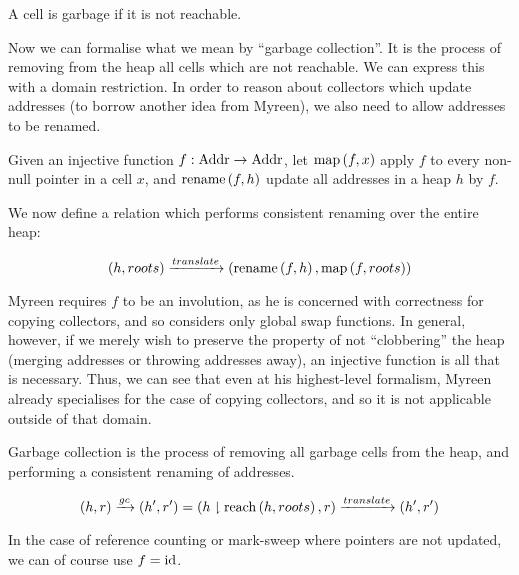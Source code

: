 \begin{definition}[Garbage]
  A cell is garbage if it is not reachable.

  \begin{prooftree}
  \end{prooftree}
\end{definition}

Now we can formalise what we mean by ``\gls{garbage collection}''. It
is the process of removing from the heap all \glspl{cell} which are
not reachable. We can express this with a domain
restriction. In order to reason about \glspl{collector} which update
addresses (to borrow another idea from Myreen), we also need to allow
addresses to be renamed.

\begin{definition}[Translation]
  Given an injective function $f : \addr \to \addr$, let $\map{f}{x}$
  apply $f$ to every non-null pointer in a cell $x$, and
  $\rename{f}{h}$ update all addresses in a heap $h$ by $f$.

  We now define a relation which performs consistent renaming over the
  entire heap:

  \[(h, roots) \translate \left(\rename{f}{h}, \map{f}{roots}\right)\]
\end{definition}

Myreen requires $f$ to be an involution, as he is concerned with
correctness for copying collectors, and so considers only global swap
functions. In general, however, if we merely wish to preserve the
property of not ``clobbering'' the heap (merging addresses or throwing
addresses away), an injective function is all that is necessary. Thus,
we can see that even at his highest-level formalism, Myreen already
specialises for the case of copying collectors, and so it is not
applicable outside of that domain.

\begin{definition}
  Garbage collection is the process of removing all garbage cells from
  the heap, and performing a consistent renaming of addresses.

  \[(h, r) \gc (h', r') = (h \restrict \reach{h}{roots}, r) \translate
  (h', r')\]
\end{definition}

In the case of \gls{reference counting} or \gls{mark-sweep} where
\glspl{pointer} are not updated, we can of course use $f = \id$.

